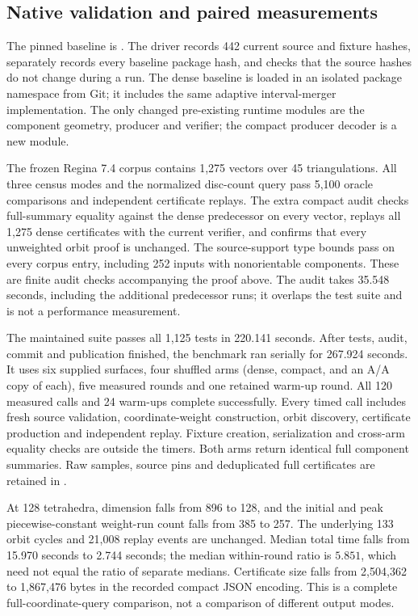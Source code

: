\subsection{Native validation and paired measurements}

The pinned baseline is . The driver
 records 442 current source
and fixture hashes, separately records every baseline package hash, and checks
that the source hashes do not change during a run. The dense baseline is
loaded in an isolated package namespace from Git; it includes the same
adaptive interval-merger implementation. The only changed pre-existing
runtime modules are the component geometry, producer and verifier; the
compact producer decoder is a new module.

The frozen Regina 7.4 corpus contains 1,275 vectors over 45 triangulations.
All three census modes and the normalized disc-count query pass 5,100 oracle
comparisons and independent certificate replays. The extra compact audit
checks full-summary equality against the dense predecessor on every vector,
replays all 1,275 dense certificates with the current verifier, and confirms
that every unweighted orbit proof is unchanged. The source-support type
bounds pass on every corpus entry, including 252 inputs with nonorientable
components. These are finite audit checks accompanying the proof above.
The audit takes 35.548 seconds, including the additional predecessor runs;
it overlaps the test suite and is not a performance measurement.

The maintained suite passes all 1,125 tests in 220.141 seconds. After tests,
audit, commit and publication finished, the benchmark ran serially for
267.924 seconds. It uses six supplied surfaces, four shuffled arms (dense,
compact, and an A/A copy of each), five measured rounds and one retained
warm-up round. All 120 measured calls and 24 warm-ups complete successfully.
Every timed call includes fresh source validation, coordinate-weight
construction, orbit discovery, certificate production and independent replay.
Fixture creation, serialization and cross-arm equality checks are outside
the timers. Both arms return identical full component summaries. Raw samples,
source pins and deduplicated full certificates are retained in
.



At 128 tetrahedra, dimension falls from 896 to 128, and the initial and peak
piecewise-constant weight-run count falls from 385 to 257. The underlying
133 orbit cycles and 21,008 replay events are unchanged. Median total time
falls from 15.970 seconds to 2.744 seconds; the median within-round ratio is
$5.851$, which need not equal the ratio of separate medians. Certificate
size falls from 2,504,362 to 1,867,476 bytes in the recorded compact JSON
encoding. This is a complete full-coordinate-query comparison, not a
comparison of different output modes.

